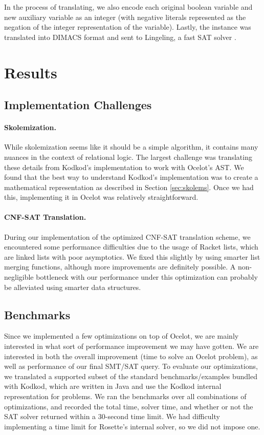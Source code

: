 \documentclass[10pt]{article}
\theoremstyle{definition}
\begin{document}
  In the process of translating, we also encode each original boolean variable and new auxiliary variable as an integer (with negative literals represented as the negation of the integer representation of the variable). Lastly, the instance was translated into DIMACS format and sent to Lingeling, a fast SAT solver \cite{biere17}.

  \section{Results}
  \subsection{Implementation Challenges}

  \paragraph{Skolemization.} While skolemization seems like it should be a simple algorithm, it contains many nuances in the context of relational logic. The largest challenge was translating these details from Kodkod's implementation to work with Ocelot's AST. We found that the best way to understand Kodkod's implementation was to create a mathematical representation as described in Section \ref{sec:skolems}. Once we had this, implementing it in Ocelot was relatively straightforward.

  \paragraph{CNF-SAT Translation.} During our implementation of the optimized CNF-SAT translation scheme, we encountered some performance difficulties due to the usage of Racket lists, which are linked lists with poor asymptotics. We fixed this slightly by using smarter list merging functions, although more improvements are definitely possible. A non-negligible bottleneck with our performance under this optimization can probably be alleviated using smarter data structures. 

  \subsection{Benchmarks}

  Since we implemented a few optimizations on top of Ocelot, we are mainly interested in what sort of performance improvement we may have gotten. We are interested in both the overall improvement (time to solve an Ocelot problem), as well as performance of our final SMT/SAT query. To evaluate our optimizations, we translated a supported subset of the standard benchmarks/examples bundled with Kodkod, which are written in Java and use the Kodkod internal representation for problems. We ran the benchmarks over all combinations of optimizations, and recorded the total time, solver time, and whether or not the SAT solver returned within a 30-second time limit. We had difficulty implementing a time limit for Rosette's internal solver, so we did not impose one.
\end{document}
